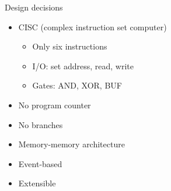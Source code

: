 \documentclass[14pt, table]{beamer}
\begin{document}
\begin{frame}{Design decisions}
	\begin{itemize}[<+->]
		\item CISC (complex instruction set computer)
		\begin{itemize}
			\item Only six instructions
			\item I/O: set address, read, write
			\item Gates: AND, XOR, BUF
		\end{itemize}
		\item No program counter
		\item No branches
		\item Memory-memory architecture
		\item Event-based
		\item Extensible
	\end{itemize}
\end{frame}
\end{document}
